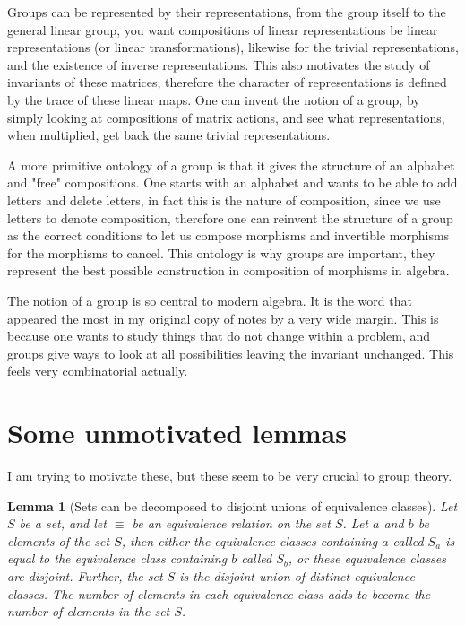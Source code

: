 \documentclass{tufte-book}
\newtheorem{lemma}[theorem]{Lemma}
\begin{document}
Groups can be represented by their representations, from the group itself to the general linear group, you want compositions of linear representations be linear representations (or linear transformations), likewise for the trivial representations, and the existence of inverse representations. This also motivates the study of invariants of these matrices, therefore the character of representations is defined by the trace of these linear maps. One can invent the notion of a group, by simply looking at compositions of matrix actions, and see what representations, when multiplied, get back the same trivial representations.

A more primitive ontology of a group is that it gives the structure of an alphabet and "free" compositions. One starts with an alphabet and wants to be able to add letters and delete letters, in fact this is the nature of composition, since we use letters to denote composition, therefore one can reinvent the structure of a group as the correct conditions to let us compose morphisms and invertible morphisms for the morphisms to cancel. This ontology is why groups are important, they represent the best possible construction in composition of morphisms in algebra.

The notion of a group is so central to modern algebra. It is the word that appeared the most in my original copy of notes by a very wide margin. This is because one wants to study things that do not change within a problem, and groups give ways to look at all possibilities leaving the invariant unchanged. This feels very combinatorial actually.

\section{Some unmotivated lemmas}

I am trying to motivate these, but these seem to be very crucial to group theory.

\begin{lemma}[Sets can be decomposed to disjoint unions of equivalence classes]
  \label{set-equiv-class-decomp}
  Let $S$ be a set, and let $\equiv$ be an equivalence relation on the set $S$.
  Let $a$ and $b$ be elements of the set $S$, then either 
  the equivalence classes containing $a$ called $S_{a}$ is equal to the 
  equivalence class containing $b$ called $S_{b}$, or these equivalence classes are disjoint.
  Further, the set $S$ is the disjoint union of distinct equivalence classes.
  The number of elements in each equivalence class adds to become the number of elements in the set $S$.
\end{lemma}
\end{document}
